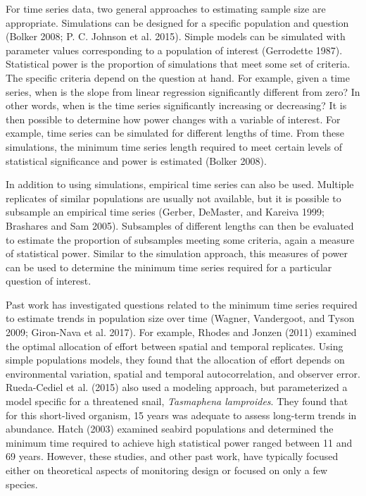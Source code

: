 \documentclass[12pt,]{article}
\begin{document}
For time series data, two general approaches to estimating sample size
are appropriate. Simulations can be designed for a specific population
and question (Bolker 2008; P. C. Johnson et al. 2015). Simple models can
be simulated with parameter values corresponding to a population of
interest (Gerrodette 1987). Statistical power is the proportion of
simulations that meet some set of criteria. The specific criteria depend
on the question at hand. For example, given a time series, when is the
slope from linear regression significantly different from zero? In other
words, when is the time series significantly increasing or decreasing?
It is then possible to determine how power changes with a variable of
interest. For example, time series can be simulated for different
lengths of time. From these simulations, the minimum time series length
required to meet certain levels of statistical significance and power is
estimated (Bolker 2008).

In addition to using simulations, empirical time series can also be
used. Multiple replicates of similar populations are usually not
available, but it is possible to subsample an empirical time series
(Gerber, DeMaster, and Kareiva 1999; Brashares and Sam 2005). Subsamples
of different lengths can then be evaluated to estimate the proportion of
subsamples meeting some criteria, again a measure of statistical power.
Similar to the simulation approach, this measures of power can be used
to determine the minimum time series required for a particular question
of interest.

Past work has investigated questions related to the minimum time series
required to estimate trends in population size over time (Wagner,
Vandergoot, and Tyson 2009; Giron-Nava et al. 2017). For example, Rhodes
and Jonzen (2011) examined the optimal allocation of effort between
spatial and temporal replicates. Using simple populations models, they
found that the allocation of effort depends on environmental variation,
spatial and temporal autocorrelation, and observer error. Rueda-Cediel
et al. (2015) also used a modeling approach, but parameterized a model
specific for a threatened snail, \emph{Tasmaphena lamproides}. They
found that for this short-lived organism, 15 years was adequate to
assess long-term trends in abundance. Hatch (2003) examined seabird
populations and determined the minimum time required to achieve high
statistical power ranged between 11 and 69 years. However, these
studies, and other past work, have typically focused either on
theoretical aspects of monitoring design or focused on only a few
species.
\end{document}
